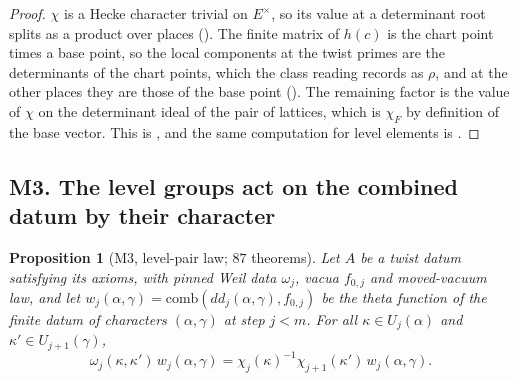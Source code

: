 \documentclass[11pt]{article}
\newtheorem{proposition}[theorem]{Proposition}
\theoremstyle{remark}
\begin{document}
\begin{proof}
$\chi$ is a Hecke character trivial on $E^\times$, so its value at a determinant root splits as a product over places (). The finite matrix of $h(c)$ is the chart point times a base point, so the local components at the twist primes are the determinants of the chart points, which the class reading records as $\rho$, and at the other places they are those of the base point (). The remaining factor is the value of $\chi$ on the determinant ideal of the pair of lattices, which is $\chi_F$ by definition of the base vector. This is , and the same computation for level elements is .
\end{proof}

\subsection{M3. The level groups act on the combined datum by their character}

\begin{proposition}[M3, level-pair law; $87$ theorems]\label{prop:M3}
Let $A$ be a twist datum satisfying its axioms, with pinned Weil data $\omega_j$, vacua $f_{0,j}$ and moved-vacuum law, and let $w_j(\alpha,\gamma)=\mathrm{comb}(dd_j(\alpha,\gamma),f_{0,j})$ be the theta function of the finite datum of characters $(\alpha,\gamma)$ at step $j<m$. For all $\kappa\in U_j(\alpha)$ and $\kappa'\in U_{j+1}(\gamma)$,
\[
\omega_j(\kappa,\kappa')\,w_j(\alpha,\gamma)=\chi_j(\kappa)^{-1}\chi_{j+1}(\kappa')\,w_j(\alpha,\gamma).
\]
\end{proposition}
\end{document}
